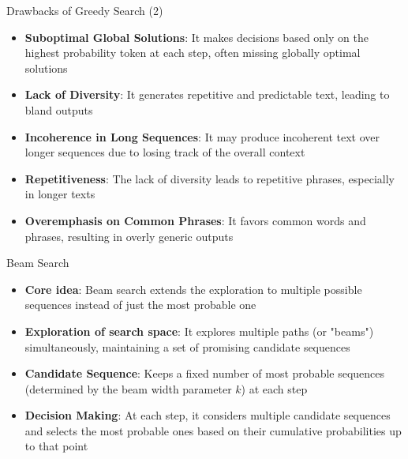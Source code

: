 
\begin{frame}{Drawbacks of Greedy Search (2)}

\vfill

\begin{itemize}
    \item \textbf{Suboptimal Global Solutions}: It makes decisions based only on the highest probability token at each step, often missing globally optimal solutions
    \item \textbf{Lack of Diversity}: It generates repetitive and predictable text, leading to bland outputs
    \item \textbf{Incoherence in Long Sequences}: It may produce incoherent text over longer sequences due to losing track of the overall context
    \item \textbf{Repetitiveness}: The lack of diversity leads to repetitive phrases, especially in longer texts
    \item \textbf{Overemphasis on Common Phrases}: It favors common words and phrases, resulting in overly generic outputs
\end{itemize}

\vfill

\end{frame}


\begin{frame}{Beam Search}

\vfill

\begin{itemize}
    \item \textbf{Core idea}: Beam search extends the exploration to multiple possible sequences instead of just the most probable one
    \item \textbf{Exploration of search space}: It explores multiple paths (or "beams") simultaneously, maintaining a set of promising candidate sequences
    \item \textbf{Candidate Sequence}: Keeps a fixed number of most probable sequences (determined by the beam width parameter $k$) at each step
    \item \textbf{Decision Making}: At each step, it considers multiple candidate sequences and selects the most probable ones based on their cumulative probabilities up to that point
\end{itemize}

\vfill

\end{frame}

